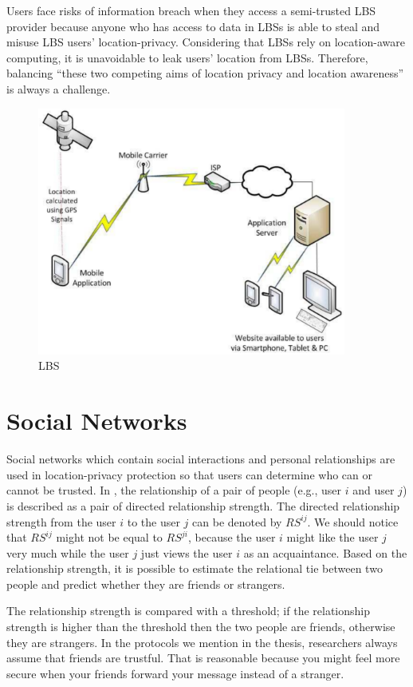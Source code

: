 Users face risks of information breach when they access a semi-trusted LBS provider because anyone who has access to data in LBSs is able to steal and misuse LBS users' location-privacy. Considering that LBSs rely on location-aware computing, it is unavoidable to leak users' location from LBSs. Therefore, balancing ``these two competing aims of location privacy and location awareness'' \cite {C20} is always a challenge.

\begin{figure} [H]
  \centering 
  \includegraphics[width=4.0in]{figures/FIG_LBS_11.png}
  \caption{LBS \cite {C11}} 
  \label{fig:LBS} %
\end{figure}

\section{ Social Networks}

\noindent Social networks which contain social interactions and personal relationships are used in location-privacy protection so that users can determine who can or cannot be trusted. In \cite {C30}, the relationship of a pair of people (e.g., user $i$ and user $j$) is described as a pair of directed relationship strength. The directed relationship strength from the user $i$ to the user $j$ can be denoted by ${RS}^{ij}$. We should notice that ${RS}^{ij}$ might not be equal to ${RS}^{ji}$, because the user $i$ might like the user $j$ very much while the user $j$ just views the user $i$ as an acquaintance. Based on the relationship strength, it is possible to estimate the relational tie between two people and predict whether they are friends or strangers. 

The relationship strength is compared with a threshold; if the relationship strength is higher than the threshold then the two people are friends, otherwise they are strangers. In the protocols we mention in the thesis, researchers always assume that friends are trustful. That is reasonable because you might feel more secure when your friends forward your message instead of a stranger. 


